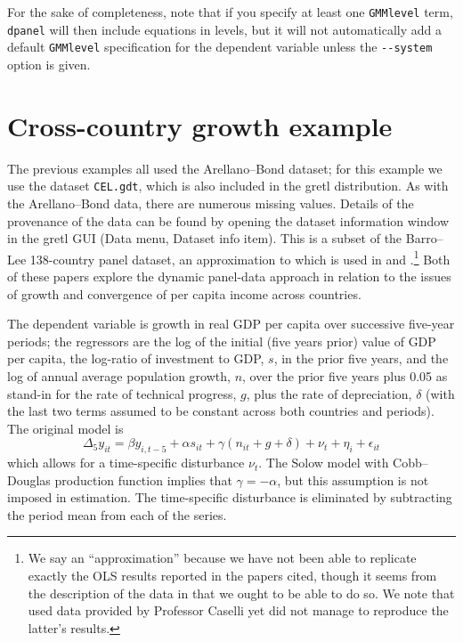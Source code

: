 For the sake of completeness, note that if you specify at least one
\texttt{GMMlevel} term, \texttt{dpanel} will then include equations in
levels, but it will not automatically add a default \texttt{GMMlevel}
specification for the dependent variable unless the \verb|--system|
option is given.

\section{Cross-country growth example}
\label{sec:dpanel-growth}

The previous examples all used the Arellano--Bond dataset; for this
example we use the dataset \texttt{CEL.gdt}, which is also included in
the gretl distribution. As with the Arellano--Bond data, there are
numerous missing values.  Details of the provenance of the data can be
found by opening the dataset information window in the gretl GUI
(\textsf{Data} menu, \textsf{Dataset info} item). This is a subset of
the Barro--Lee 138-country panel dataset, an approximation to which is
used in \citet*{CEL96} and \citet*{Bond2001}.\footnote{We say an
  ``approximation'' because we have not been able to replicate exactly
  the OLS results reported in the papers cited, though it seems from
  the description of the data in \cite{CEL96} that we ought to be able
  to do so.  We note that \cite{Bond2001} used data provided by
  Professor Caselli yet did not manage to reproduce the latter's
  results.}  Both of these papers explore the dynamic panel-data
approach in relation to the issues of growth and convergence of per
capita income across countries.

The dependent variable is growth in real GDP per capita over
successive five-year periods; the regressors are the log of the
initial (five years prior) value of GDP per capita, the log-ratio of
investment to GDP, $s$, in the prior five years, and the log of annual
average population growth, $n$, over the prior five years plus 0.05 as
stand-in for the rate of technical progress, $g$, plus the rate of
depreciation, $\delta$ (with the last two terms assumed to be constant
across both countries and periods).  The original model is
\begin{equation}
\label{eq:CEL96}
\Delta_5 y_{it} = \beta y_{i,t-5} + \alpha s_{it} + \gamma (n_{it} +
g + \delta) + \nu_t + \eta_i + \epsilon_{it}
\end{equation}
which allows for a time-specific disturbance $\nu_t$. The Solow model
with Cobb--Douglas production function implies that $\gamma =
-\alpha$, but this assumption is not imposed in estimation. The
time-specific disturbance is eliminated by subtracting the period mean
from each of the series.

